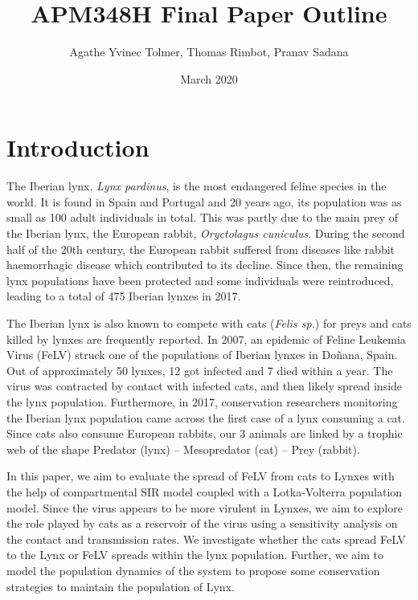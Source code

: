 \documentclass{article}
\title{APM348H Final Paper Outline}
\author{Agathe Yvinec Tolmer, Thomas Rimbot, Pranav Sadana }
\date{March 2020}
\begin{document}
\maketitle

\section{Introduction}
\quad The Iberian lynx, \emph{Lynx pardinus}, is the most endangered feline species in the world. It is found in Spain and Portugal and 20 years ago, its population was as small as 100 adult individuals in total. This was partly due to the main prey of the Iberian lynx, the European rabbit, \emph{Oryctolagus cuniculus}. During the second half of the 20th century, the European rabbit suffered from diseases like rabbit haemorrhagic disease which contributed to its decline. Since then, the remaining lynx populations have been protected and some individuals were reintroduced, leading to a total of 475 Iberian lynxes in 2017\cite{noauthor_iberian_nodate}.

\quad The Iberian lynx is also known to compete with cats (\emph{Felis sp.}) for preys and cats killed by lynxes are frequently reported. In 2007, an epidemic of Feline Leukemia Virus (FeLV) struck one of the populations of Iberian lynxes in Doñana, Spain. Out of approximately 50 lynxes, 12 got infected and 7 died within a year\cite{meli_feline_2010}. The virus was contracted by contact with infected cats, and then likely spread inside the lynx population. Furthermore, in 2017, conservation researchers monitoring the Iberian lynx population came across the first case of a lynx consuming a cat\cite{najera_lynx_2019}. Since cats also consume European rabbits, our 3 animals are linked by a trophic web of the shape Predator (lynx) – Mesopredator (cat) – Prey (rabbit). 

\quad In this paper, we aim to evaluate the spread of FeLV from cats to Lynxes with the help of compartmental SIR model coupled with a Lotka-Volterra population model. Since the virus appears to be more virulent in Lynxes, we aim to explore  the role played by cats as a reservoir of the virus using a sensitivity analysis on the contact and transmission rates. We investigate whether the cats spread FeLV to the Lynx or FeLV spreads within the lynx population. Further, we aim to model the population dynamics of the system to propose some conservation strategies to maintain the population of Lynx. 
\end{document}

